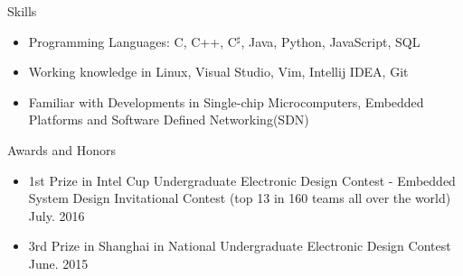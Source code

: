 \documentclass[10pt,oneside]{article}
\newenvironment{ressection}[1]{
	\vspace{4pt}
	{\fontfamily{phv}\selectfont\Large#1}
	\begin{itemize}
	\vspace{3pt}
}{
	\end{itemize}
}
\newcommand{\resitem}[1]{
	\vspace{-4pt}
	\item \begin{flushleft} #1 \end{flushleft}
}
\begin{document}

\begin{ressection}{Skills}

	\resitem{Programming Languages: C, C++, C$^\sharp$, Java, Python, JavaScript, SQL}
	\resitem{Working knowledge in Linux, Visual Studio, Vim, Intellij IDEA, Git}
	\resitem{Familiar with Developments in Single-chip Microcomputers, Embedded Platforms and Software Defined Networking(SDN)}
	
\end{ressection}




\begin{ressection}{Awards and Honors}
	\resitem{1st Prize in Intel Cup Undergraduate Electronic Design Contest - Embedded System Design Invitational Contest (top 13 in 160 teams all over the world) \hfill July. 2016}
	\resitem{3rd Prize in Shanghai in National Undergraduate Electronic Design Contest \hfill {June. 2015}}
\end{ressection}
\end{document}
